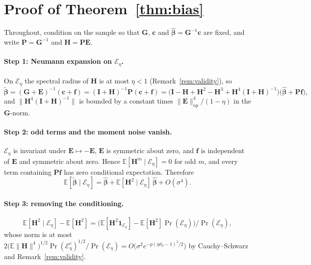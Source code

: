 \documentclass[11pt]{article}
\theoremstyle{definition}
\theoremstyle{plain}
\newcommand{\E}{\mathbb{E}}
\newcommand{\bbeta}{\boldsymbol{\beta}}
\newcommand{\bc}{\mathbf{c}}
\newcommand{\bG}{\mathbf{G}}
\newcommand{\bP}{\mathbf{P}}
\newcommand{\bE}{\mathbf{E}}
\newcommand{\bH}{\mathbf{H}}
\newcommand{\bI}{\mathbf{I}}
\newcommand{\bff}{\mathbf{f}}
\begin{document}
\section{Proof of Theorem~\ref{thm:bias}}
\label{app:proof}

Throughout, condition on the sample so that $\bG$, $\bc$ and $\hat{\bbeta} = \bG^{-1}\bc$ are fixed, and write $\bP = \bG^{-1}$ and $\bH = \bP\bE$.

\paragraph{Step 1: Neumann expansion on $\mathcal{E}_{\eta}$.}
On $\mathcal{E}_{\eta}$ the spectral radius of $\bH$ is at most $\eta < 1$ (Remark~\ref{rem:validity}), so
\[
  \tilde{\bbeta} = (\bG + \bE)^{-1}(\bc + \bff) = (\bI + \bH)^{-1}\bP(\bc + \bff)
  = \bigl(\bI - \bH + \bH^{2} - \bH^{3} + \bH^{4}(\bI + \bH)^{-1}\bigr)\bigl(\hat{\bbeta} + \bP\bff\bigr),
\]
and $\|\bH^{4}(\bI + \bH)^{-1}\|$ is bounded by a constant times $\|\bE\|_{\mathrm{op}}^{4}/(1 - \eta)$ in the $\bG$-norm.

\paragraph{Step 2: odd terms and the moment noise vanish.}
$\mathcal{E}_{\eta}$ is invariant under $\bE \mapsto -\bE$, $\bE$ is symmetric about zero, and $\bff$ is independent of $\bE$ and symmetric about zero. Hence $\E[\bH^{m} \mid \mathcal{E}_{\eta}] = 0$ for odd $m$, and every term containing $\bP\bff$ has zero conditional expectation. Therefore
\[
  \E[\tilde{\bbeta} \mid \mathcal{E}_{\eta}] = \hat{\bbeta} + \E[\bH^{2} \mid \mathcal{E}_{\eta}]\,\hat{\bbeta} + O(\sigma^{4}).
\]

\paragraph{Step 3: removing the conditioning.}
\[
  \E[\bH^{2} \mid \mathcal{E}_{\eta}] - \E[\bH^{2}] = \bigl(\E[\bH^{2}\mathbf{1}_{\mathcal{E}_{\eta}}] - \E[\bH^{2}]\Pr(\mathcal{E}_{\eta})\bigr)/\Pr(\mathcal{E}_{\eta}),
\]
whose norm is at most $2\bigl(\E\|\bH\|^{4}\bigr)^{1/2}\Pr(\mathcal{E}_{\eta}^{c})^{1/2}/\Pr(\mathcal{E}_{\eta}) = O\bigl(\sigma^{2}e^{-p(\eta\vartheta_0 - 1)^{2}/2}\bigr)$ by Cauchy--Schwarz and Remark~\ref{rem:validity}.
\end{document}
